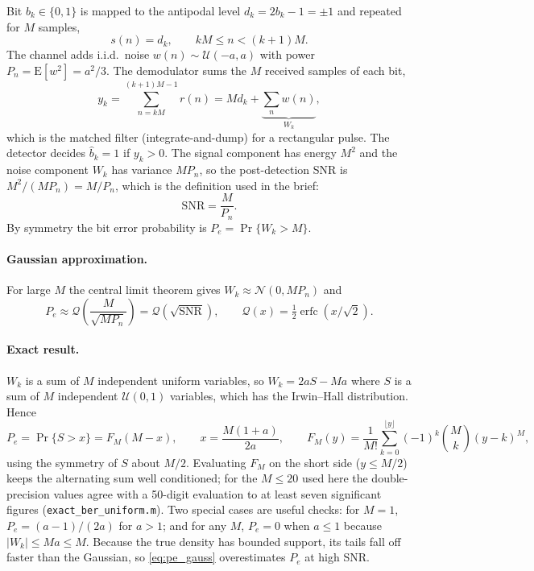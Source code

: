 \documentclass[11pt,a4paper]{article}
\newcommand{\Q}{\mathcal{Q}}
\newcommand{\snr}{\mathrm{SNR}}
\begin{document}
Bit $b_k\in\{0,1\}$ is mapped to the antipodal level $d_k = 2b_k - 1 = \pm1$ and
repeated for $M$ samples,
\begin{equation}
  s(n) = d_k, \qquad kM \le n < (k+1)M .
\end{equation}
The channel adds i.i.d.\ noise $w(n)\sim\mathcal{U}(-a,a)$ with power
$P_n = \mathrm{E}[w^2] = a^2/3$. The demodulator sums the $M$ received samples of
each bit,
\begin{equation}
  y_k = \sum_{n=kM}^{(k+1)M-1} r(n) = M d_k + \underbrace{\sum_{n} w(n)}_{W_k},
  \label{eq:yk}
\end{equation}
which is the matched filter (integrate-and-dump) for a rectangular pulse. The
detector decides $\hat b_k = 1$ if $y_k>0$. The signal component has energy $M^2$
and the noise component $W_k$ has variance $MP_n$, so the post-detection SNR is
$M^2/(MP_n) = M/P_n$, which is the definition used in the brief:
\begin{equation}
  \snr = \frac{M}{P_n}.
\end{equation}
By symmetry the bit error probability is $P_e = \Pr\{W_k > M\}$.

\paragraph{Gaussian approximation.} For large $M$ the central limit theorem gives
$W_k\approx\mathcal{N}(0, MP_n)$ and
\begin{equation}
  P_e \approx \Q\!\left(\frac{M}{\sqrt{MP_n}}\right) = \Q\!\left(\sqrt{\snr}\right),
  \qquad \Q(x)=\tfrac12\operatorname{erfc}(x/\sqrt2).
  \label{eq:pe_gauss}
\end{equation}

\paragraph{Exact result.} $W_k$ is a sum of $M$ independent uniform variables, so
$W_k = 2aS - Ma$ where $S$ is a sum of $M$ independent $\mathcal{U}(0,1)$ variables,
which has the Irwin--Hall distribution. Hence
\begin{equation}
  P_e = \Pr\{S > x\} = F_M(M-x), \qquad x = \frac{M(1+a)}{2a},\qquad
  F_M(y) = \frac{1}{M!}\sum_{k=0}^{\lfloor y\rfloor}(-1)^k\binom{M}{k}(y-k)^M ,
  \label{eq:pe_exact}
\end{equation}
using the symmetry of $S$ about $M/2$. Evaluating $F_M$ on the short side
($y\le M/2$) keeps the alternating sum well conditioned; for the $M\le20$ used here
the double-precision values agree with a 50-digit evaluation to at least seven
significant figures (\texttt{exact\_ber\_uniform.m}). Two special cases are useful
checks: for $M=1$, $P_e = (a-1)/(2a)$ for $a>1$; and for any $M$, $P_e = 0$ when
$a\le1$ because $|W_k|\le Ma \le M$. Because the true density has bounded support,
its tails fall off faster than the Gaussian, so \eqref{eq:pe_gauss} overestimates
$P_e$ at high SNR.
\end{document}
